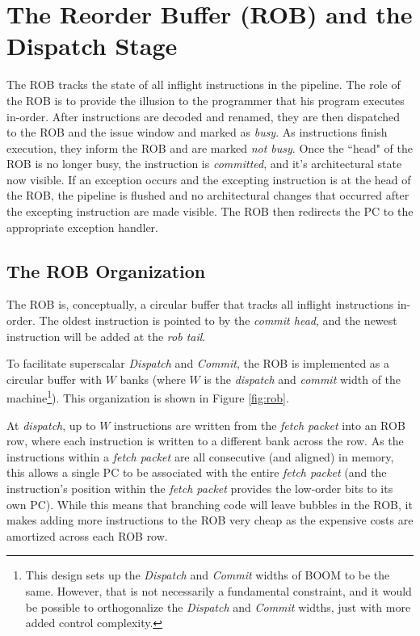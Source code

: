 \chapter{The Reorder Buffer (ROB) and the Dispatch Stage}\label{chapter:rob}


The ROB tracks the state of all inflight instructions in the pipeline. The role of the ROB is to provide the illusion to the programmer that his program executes in-order. 
After instructions are decoded and renamed, they are then dispatched to the ROB and the issue window and marked as {\em busy}. 
As instructions finish execution, they inform the ROB and are marked {\em not busy}. 
Once the ``head" of the ROB is no longer busy, the instruction is {\em committed}, and it's architectural state now visible. If an exception occurs and the excepting instruction is at the head of the ROB, the pipeline is flushed and no architectural changes that occurred after the excepting instruction are made visible. The ROB then redirects the PC to the appropriate exception handler. 

\section{The ROB Organization}

The ROB is, conceptually, a circular buffer that tracks all inflight instructions in-order. The oldest instruction is pointed to by the {\em commit head}, and the newest instruction will be added at the {\em rob tail}. 

To facilitate superscalar {\em Dispatch} and {\em Commit}, the ROB is implemented as a circular buffer with $W$ banks (where $W$ is the {\em dispatch} and {\em commit} width of the machine\footnote{This design sets up the {\em Dispatch} and {\em Commit} widths of BOOM to be the same. However, that is not necessarily a fundamental constraint, and it would be possible to orthogonalize the {\em Dispatch} and {\em Commit} widths, just with more added control complexity.}). This organization is shown in Figure \ref{fig:rob}. 


At {\em dispatch}, up to $W$ instructions are written from the {\em fetch packet} into an ROB row, where each instruction is written to a different bank across the row.  As the instructions within a {\em fetch packet} are all consecutive (and aligned) in memory, this allows a single PC to be associated with the entire {\em fetch packet} (and the instruction's position within the {\em fetch packet} provides the low-order bits to its own PC).  While this means that branching code will leave bubbles in the ROB, it makes adding more instructions to the ROB very cheap as the expensive costs are amortized across each ROB row.


